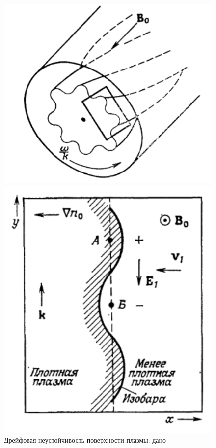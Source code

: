 \documentclass[10pt, a4paper]{article}
\begin{document}
\begin{itemize}
\begin{itemize}
		\begin{figure}[ht]
			\begin{center}
				\begin{minipage}[ht]{0.49\linewidth}
					\includegraphics[height=0.25\textheight]{drift_instability_given}
					\caption{Дрейфовая неустойчивость поверхности плазмы: дано~\cite{chen}}
					\label{fig:drift_instability_given}
				\end{minipage}
				\hfill
				\begin{minipage}[ht]{0.49\linewidth}
					\includegraphics[height=0.25\textheight]{drift_instability_result}

\end{minipage}
\end{center}
\end{figure}
\end{itemize}
\end{itemize}
\end{document}

